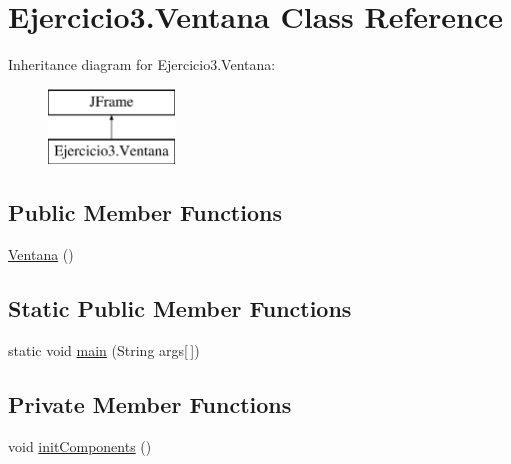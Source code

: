 \hypertarget{class_ejercicio3_1_1_ventana}{}\section{Ejercicio3.\+Ventana Class Reference}
\label{class_ejercicio3_1_1_ventana}
Inheritance diagram for Ejercicio3.\+Ventana\+:\begin{figure}[H]
\begin{center}
\leavevmode
\includegraphics[height=2.000000cm]{class_ejercicio3_1_1_ventana}
\end{center}
\end{figure}
\subsection*{Public Member Functions}
\begin{DoxyCompactItemize}
\item 
\mbox{\hyperlink{class_ejercicio3_1_1_ventana_a58b0e4567e87b274acb3c7561643d17e}{Ventana}} ()
\end{DoxyCompactItemize}
\subsection*{Static Public Member Functions}
\begin{DoxyCompactItemize}
\item 
static void \mbox{\hyperlink{class_ejercicio3_1_1_ventana_acd36ab24992fabfa4014d39b46411c2b}{main}} (String args\mbox{[}$\,$\mbox{]})
\end{DoxyCompactItemize}
\subsection*{Private Member Functions}
\begin{DoxyCompactItemize}
\item 
void \mbox{\hyperlink{class_ejercicio3_1_1_ventana_ad598831bd9aca9eafe8dd6c558084a1d}{init\+Components}} ()
\end{DoxyCompactItemize}
